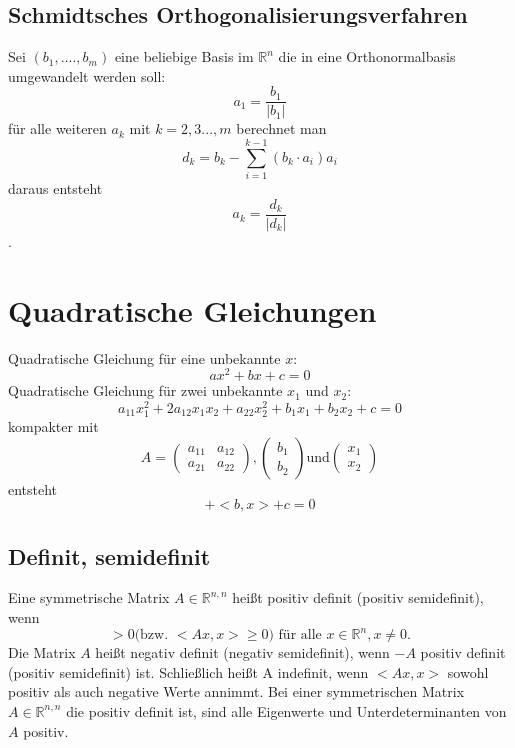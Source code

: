 \documentclass[12pt,a4paper]{article}
\begin{document}
\subsection{Schmidtsches Orthogonalisierungsverfahren}
Sei $(b_1,...., b_m)$ eine beliebige Basis im $\mathbb{R}^n$ die in eine Orthonormalbasis umgewandelt werden soll:
\[a_1 = \frac{b_1}{\left|b_1\right|}\]
für alle weiteren $a_k$ mit $k= 2,3...,m$ berechnet man
\[d_k = b_k - \sum\limits_{i=1}^{k-1}{(b_k \cdot a_i)a_i}\]
daraus entsteht
\[a_k = \frac{d_k}{\left|d_k\right|}\]
.

\section{Quadratische Gleichungen}
Quadratische Gleichung für eine unbekannte $x$:
\[ax^2+bx+c = 0\]
Quadratische Gleichung für zwei unbekannte $x_1$ und $x_2$:
\[a_{11}x_1^2 + 2 a_{12}x_1x_2 + a_{22}x_2^2 + b_1x_1 + b_2 x_2 +c = 0\]
kompakter mit
\[A= \begin{pmatrix} a_{11} & a_{12} \\ a_{21} & a_{22} \end{pmatrix},
\begin{pmatrix} b_1 \\ b_2 \end{pmatrix} \text{und} 
\begin{pmatrix} x_1 \\ x_2 \end{pmatrix} \]
entsteht
\[<Ax, x> + <b,x> + c = 0\]

\subsection{Definit, semidefinit}
\glqq Eine symmetrische Matrix $A \in \mathbb{R}^{n,n}$ heißt positiv definit (positiv semidefinit), wenn 
\[<Ax, x> > 0 \text{(bzw. } <Ax, x> \geq 0 \text{) für alle } x \in \mathbb{R}^n, x\neq 0.\]
Die Matrix $A$ heißt negativ definit (negativ semidefinit), wenn $-A$ positiv definit (positiv semidefinit) ist. Schließlich heißt A indefinit, wenn $<Ax, x>$ sowohl positiv als auch negative Werte annimmt.\grqq
Bei einer symmetrischen Matrix $A \in \mathbb{R}^{n,n}$ die positiv definit ist, sind alle Eigenwerte und Unterdeterminanten von $A$ positiv.

\end{document}
